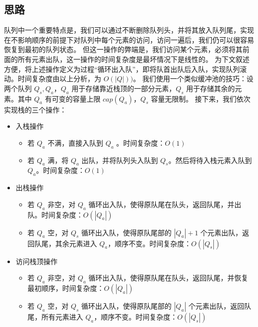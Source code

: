\documentclass{tufte-handout}
\begin{document}
\begin{CJK*}{UTF8}{gbsn}
\subsection{思路}
队列中一个重要特点是，我们可以通过不断删除队列头，并将其放入队列尾，实现在不影响顺序的前提下对队列中每个元素的访问，访问一遍后，我们仍可以很容易恢复到最初的队列状态。
但这一操作的弊端是，我们访问某个元素，必须将其前面的所有元素出队，这一操作的时间复杂度是最坏情况下是线性的。
为下文叙述方便，将上述操作定义为过程“循环出入队”，即将队首出队后入队，实现队列滚动。时间复杂度由以上分析，为 $O(|Q|))$。
我们使用一个类似缓冲池的技巧：设两个队列 $Q_s,Q_a$，$Q_a$ 用于存储靠近栈顶的一部分元素，$Q_s$ 用于存储其余的元素。其中 $Q_a$ 有可变的容量上限 $cap(Q_a)$，$Q_s$ 容量无限制。
接下来，我们依次实现栈的三个操作：
\begin{itemize}
    \item 入栈操作
    \begin{itemize}
        \item 若 $Q_a$ 不满，直接入队到 $Q_a$ 。时间复杂度：$O(1)$
        \item 若 $Q_a$ 满，将 $Q_a$ 出队，并将队列头入队到 $Q_s$。然后将待入栈元素入队到 $Q_a$。时间复杂度：$O(1)$
    \end{itemize}
    \item 出栈操作
    \begin{itemize}
        \item 若 $Q_a$ 非空，对 $Q_a$ 循环出入队，使得原队尾在队头，返回队尾，并出队。时间复杂度：$O(|Q_a|)$
        \item 若 $Q_a$ 空，对 $Q_s$ 循环出入队，使得原队尾部的 $|Q_a|+1$ 个元素出队，返回队尾，其余元素进入 $Q_a$，顺序不变。时间复杂度：$O(|Q_s|)$
    \end{itemize}
    \item 访问栈顶操作
    \begin{itemize}
        \item 若 $Q_a$ 非空，对 $Q_a$ 循环出入队，使得原队尾在队头，返回队尾，并恢复最初顺序，时间复杂度：$O(|Q_a|)$
        \item 若 $Q_a$ 空，对 $Q_s$ 循环出入队，使得原队尾部的 $|Q_a|$ 个元素出队，返回队尾，所有元素进入 $Q_a$，顺序不变。时间复杂度：$O(|Q_s|)$
    \end{itemize}

\end{itemize}
\end{CJK*}
\end{document}
